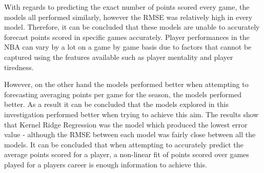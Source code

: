 \documentclass[a4paper,11pt,twoside]{article}
\begin{document}
With regards to predicting the exact number of points scored every game, the models all performed similarly, however the RMSE was relatively high in every model. Therefore, it can be concluded that these models are unable to accurately forecast  points scored in specific games accurately. Player performances in the NBA can vary by a lot on a game by game basis due to factors that cannot be captured using the features available such as player mentality and player tiredness.

However, on the other hand the models performed better when attempting to forecasting averaging points per game for the season, the models performed better. As a result it can be concluded that the models explored in this investigation performed better when trying to achieve this aim. The results show that Kernel Ridge Regression was the model which produced the lowest error value - although the RMSE between each model was fairly close between all the models. It can be concluded that when attempting to accurately predict the average points scored for a player, a non-linear fit of points scored over games played for a players career is enough information to achieve this.
\end{document}
